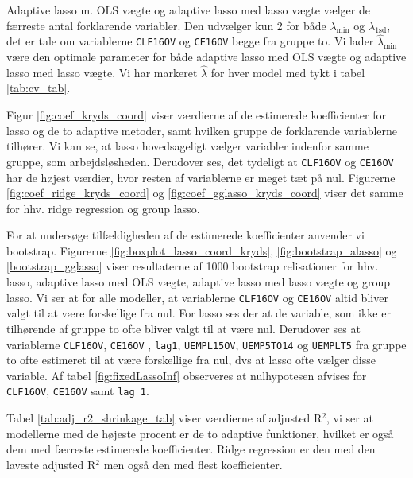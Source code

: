 Adaptive lasso m. OLS vægte og adaptive lasso med lasso vægte vælger de færreste antal forklarende variabler. 
Den udvælger kun 2 for både  $\lambda_{\min}$ og $\lambda_{1\text{sd}}$, det er tale om variablerne \texttt{CLF16OV} og \texttt{CE16OV} begge fra gruppe to. 
Vi lader  $\widehat{\lambda}_{\min}$ være den optimale parameter for både adaptive lasso med OLS vægte og adaptive lasso med lasso vægte. 
Vi har markeret $\widehat{\lambda}$ for hver model med tykt i tabel  \ref{tab:cv_tab}. 

Figur \ref{fig:coef_kryds_coord} viser værdierne af de estimerede koefficienter for lasso og de to adaptive metoder, samt hvilken gruppe de forklarende variablerne tilhører. 
Vi kan se, at lasso hovedsageligt vælger variabler indenfor samme gruppe, som arbejdsløsheden. 
Derudover ses, det tydeligt at \texttt{CLF16OV} og \texttt{CE16OV} har de højest værdier, hvor resten af variablerne er meget tæt på nul. 
Figurerne \ref{fig:coef_ridge_kryds_coord} og \ref{fig:coef_gglasso_kryds_coord} viser det samme for hhv. ridge regression og group lasso.    


For at undersøge tilfældigheden af de estimerede koefficienter anvender vi bootstrap. 
Figurerne \ref{fig:boxplot_lasso_coord_kryds}, \ref{fig:bootstrap_alasso} og \ref{bootstrap_gglasso} viser resultaterne af 1000 bootstrap relisationer for hhv. lasso, adaptive lasso med OLS vægte, adaptive lasso med lasso vægte og group lasso. 
Vi ser at for alle modeller, at variablerne \texttt{CLF16OV} og \texttt{CE16OV} altid bliver valgt til at være forskellige fra nul. 
For lasso ses der at de variable, som ikke er tilhørende af gruppe to ofte bliver valgt til at være nul. 
Derudover ses at variablerne  \texttt{CLF16OV},  \texttt{CE16OV} , \texttt{lag1}, \texttt{UEMPL15OV}, \texttt{UEMP5TO14} og \texttt{UEMPLT5} fra gruppe to ofte estimeret til at være forskellige fra nul, dvs at lasso ofte vælger disse variable. 
Af tabel \ref{fig:fixedLassoInf} observeres at nulhypotesen afvises for \texttt{CLF16OV}, \texttt{CE16OV} samt \texttt{lag 1}.



Tabel  \ref{tab:adj_r2_shrinkage_tab} viser værdierne af adjusted R$^2$, vi ser at modellerne med de højeste procent er de to adaptive funktioner, hvilket er også dem med færreste estimerede koefficienter. Ridge regression er den med den laveste adjusted R$^2$ men også den med flest koefficienter. 

